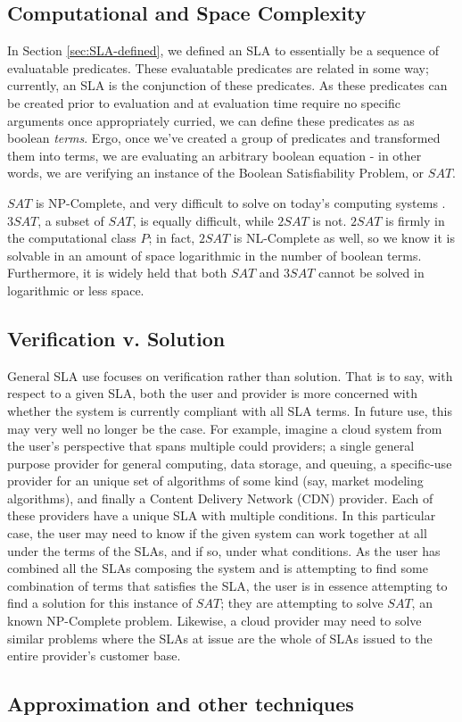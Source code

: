 \subsection{Computational and Space Complexity}
In Section \ref{sec:SLA-defined}, we defined an SLA to essentially be a sequence of evaluatable predicates.  These evaluatable predicates are related in some way; currently, an SLA is the conjunction of these predicates.  As these predicates can be created prior to evaluation and at evaluation time require no specific arguments once appropriately curried, we can define these predicates as as boolean {\it terms}.  Ergo, once we've created a group of predicates and transformed them into terms, we are evaluating an arbitrary boolean equation - in other words, we are verifying an instance of the Boolean Satisfiability Problem, or $ SAT $.

$ SAT $ is NP-Complete, and very difficult to solve on today's computing systems \cite{comptheory:sipser:intro-comp-theory}.  $ 3SAT $, a subset of $ SAT $, is equally difficult, while $ 2SAT $ is not.  $ 2SAT $ is firmly in the computational class $ P $; in fact, $ 2SAT $ is NL-Complete as well, so we know it is solvable in an amount of space logarithmic in the number of boolean terms\cite{comptheory:papadimitriou:computational-complexity}.  Furthermore, it is widely held that both $ SAT $ and $ 3SAT $ cannot be solved in logarithmic or less space.

\subsection{Verification v. Solution}
General SLA use focuses on verification rather than solution.  That is to say, with respect to a given SLA, both the user and provider is more concerned with whether the system is currently compliant with all SLA terms.  In future use, this may very well no longer be the case.  For example, imagine a cloud system from the user's perspective that spans multiple could providers; a single general purpose provider for general computing, data storage, and queuing, a specific-use provider for an unique set of algorithms of some kind (say, market modeling algorithms), and finally a Content Delivery Network (CDN) provider.  Each of these providers have a unique SLA with multiple conditions.  In this particular case, the user may need to know if the given system can work together at all under the terms of the SLAs, and if so, under what conditions.  As the user has combined all the SLAs composing the system and is attempting to find some combination of terms that satisfies the SLA, the user is in essence attempting to find a solution for this instance of $ SAT $; they are attempting to solve $ SAT $, an known NP-Complete problem.  Likewise, a cloud provider may need to solve similar problems where the SLAs at issue are the whole of SLAs issued to the entire provider's customer base.

\subsection{Approximation and other techniques}





